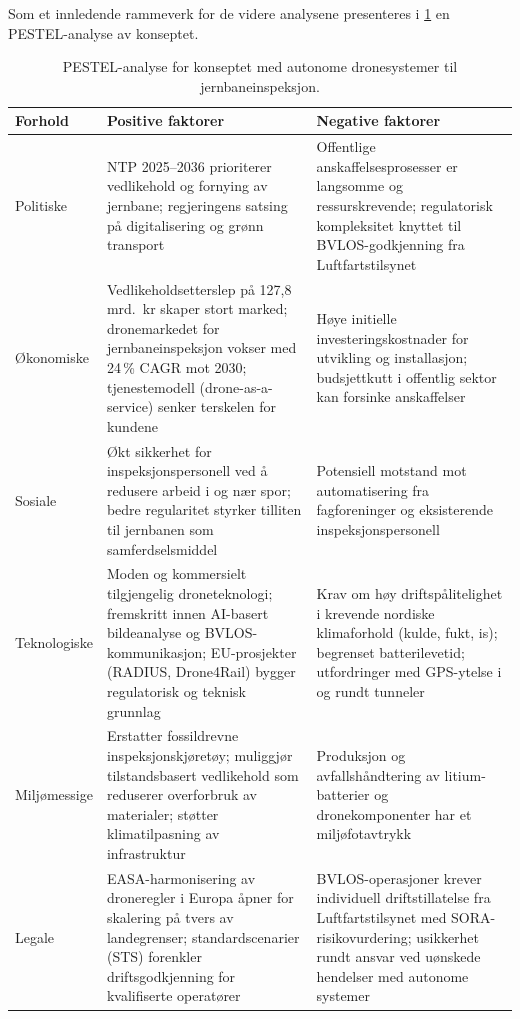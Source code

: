 Som et innledende rammeverk for de videre analysene presenteres i \cref{tab:pestel} en PESTEL-analyse av konseptet.

\begin{table}[ht]
    \centering
    \begin{tabular}{p{2cm}p{5cm}p{5cm}}
        \toprule
        \textbf{Forhold} & \textbf{Positive faktorer} & \textbf{Negative faktorer} \\
        \midrule
        Politiske &
        NTP 2025--2036 prioriterer vedlikehold og fornying av jernbane;
        regjeringens satsing på digitalisering og grønn transport &
        Offentlige anskaffelsesprosesser er langsomme og ressurskrevende;
        regulatorisk kompleksitet knyttet til BVLOS-godkjenning fra
        Luftfartstilsynet \\
        \addlinespace
        Økonomiske &
        Vedlikeholdsetterslep på 127,8 mrd.\ kr skaper stort marked;
        dronemarkedet for jernbaneinspeksjon vokser med 24\,\% CAGR mot
        2030; tjenestemodell (drone-as-a-service) senker terskelen for
        kundene &
        Høye initielle investeringskostnader for utvikling og installasjon;
        budsjettkutt i offentlig sektor kan forsinke anskaffelser \\
        \addlinespace
        Sosiale &
        Økt sikkerhet for inspeksjonspersonell ved å redusere arbeid i og
        nær spor; bedre regularitet styrker tilliten til jernbanen som
        samferdselsmiddel &
        Potensiell motstand mot automatisering fra fagforeninger og
        eksisterende inspeksjonspersonell \\
        \addlinespace
        Teknologiske &
        Moden og kommersielt tilgjengelig droneteknologi; fremskritt innen
        AI-basert bildeanalyse og BVLOS-kommunikasjon; EU-prosjekter
        (RADIUS, Drone4Rail) bygger regulatorisk og teknisk grunnlag &
        Krav om høy driftspålitelighet i krevende nordiske klimaforhold
        (kulde, fukt, is); begrenset batterilevetid; utfordringer med
        GPS-ytelse i og rundt tunneler \\
        \addlinespace
        Miljømessige &
        Erstatter fossildrevne inspeksjonskjøretøy;
        muliggjør tilstandsbasert vedlikehold som reduserer overforbruk
        av materialer; støtter klimatilpasning av infrastruktur &
        Produksjon og avfallshåndtering av litium-batterier og
        dronekomponenter har et miljøfotavtrykk \\
        \addlinespace
        Legale &
        EASA-harmonisering av droneregler i Europa åpner for skalering
        på tvers av landegrenser; standardscenarier (STS) forenkler
        driftsgodkjenning for kvalifiserte operatører &
        BVLOS-operasjoner krever individuell driftstillatelse fra
        Luftfartstilsynet med SORA-risikovurdering; usikkerhet rundt
        ansvar ved uønskede hendelser med autonome systemer \\
        \bottomrule
    \end{tabular}
    \caption{PESTEL-analyse for konseptet med autonome dronesystemer til
    jernbaneinspeksjon.}
    \label{tab:pestel}
\end{table}